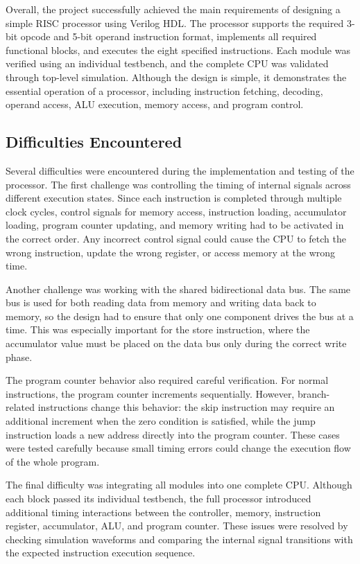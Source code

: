 Overall, the project successfully achieved the main requirements of designing a simple RISC processor using Verilog HDL. The processor supports the required 3-bit opcode and 5-bit operand instruction format, implements all required functional blocks, and executes the eight specified instructions. Each module was verified using an individual testbench, and the complete CPU was validated through top-level simulation. Although the design is simple, it demonstrates the essential operation of a processor, including instruction fetching, decoding, operand access, ALU execution, memory access, and program control.

\subsection{Difficulties Encountered}

Several difficulties were encountered during the implementation and testing of the processor. The first challenge was controlling the timing of internal signals across different execution states. Since each instruction is completed through multiple clock cycles, control signals for memory access, instruction loading, accumulator loading, program counter updating, and memory writing had to be activated in the correct order. Any incorrect control signal could cause the CPU to fetch the wrong instruction, update the wrong register, or access memory at the wrong time.

Another challenge was working with the shared bidirectional data bus. The same bus is used for both reading data from memory and writing data back to memory, so the design had to ensure that only one component drives the bus at a time. This was especially important for the store instruction, where the accumulator value must be placed on the data bus only during the correct write phase.

The program counter behavior also required careful verification. For normal instructions, the program counter increments sequentially. However, branch-related instructions change this behavior: the skip instruction may require an additional increment when the zero condition is satisfied, while the jump instruction loads a new address directly into the program counter. These cases were tested carefully because small timing errors could change the execution flow of the whole program.

The final difficulty was integrating all modules into one complete CPU. Although each block passed its individual testbench, the full processor introduced additional timing interactions between the controller, memory, instruction register, accumulator, ALU, and program counter. These issues were resolved by checking simulation waveforms and comparing the internal signal transitions with the expected instruction execution sequence.

